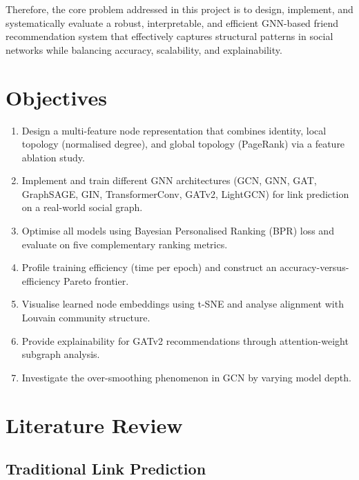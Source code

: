 \documentclass[12pt,a4paper]{article}
\begin{document}
Therefore, the core problem addressed in this project is to design, implement, and systematically evaluate a robust, interpretable, and efficient GNN-based friend recommendation system that effectively captures structural patterns in social networks while balancing accuracy, scalability, and explainability.

\section{Objectives}
\label{sec:objectives}

\begin{enumerate}[leftmargin=*, label=\textbf{O\arabic*}.]
     \item Design a multi-feature node representation that combines identity, local topology (normalised degree), and global topology (PageRank) via a feature ablation study.
    \item  Implement and train different GNN architectures (GCN, GNN, GAT, GraphSAGE,
GIN, TransformerConv, GATv2, LightGCN) for link prediction on a real-world
social graph.
    \item Optimise all models using Bayesian Personalised Ranking (BPR) loss and evaluate on five complementary ranking metrics.
    \item Profile training efficiency (time per epoch) and construct an accuracy-versus-efficiency Pareto frontier.
    \item Visualise learned node embeddings using t-SNE and analyse alignment with Louvain community structure.
    \item Provide explainability for GATv2 recommendations through attention-weight subgraph analysis.
    \item Investigate the over-smoothing phenomenon in GCN by varying model depth.
\end{enumerate}

\section{Literature Review}
\label{sec:litreview}

\subsection{Traditional Link Prediction}
\end{document}
